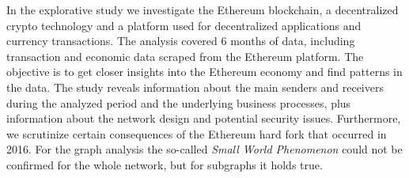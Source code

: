 In the explorative study we investigate the Ethereum blockchain,  a decentralized crypto technology and a platform used for decentralized applications and currency transactions. 
The analysis covered 6 months of data, including transaction and economic data scraped from the Ethereum platform. 
The objective is to get closer insights into the Ethereum economy and find patterns in the data.
The study reveals information about the main senders and receivers during the analyzed period and the underlying business processes, plus information about the network design and potential security issues. 
Furthermore, we scrutinize certain consequences of the Ethereum hard fork that occurred in 2016.
For the graph analysis the so-called \emph{Small World Phenomenon} could not be confirmed for the whole network, but for subgraphs it holds true.